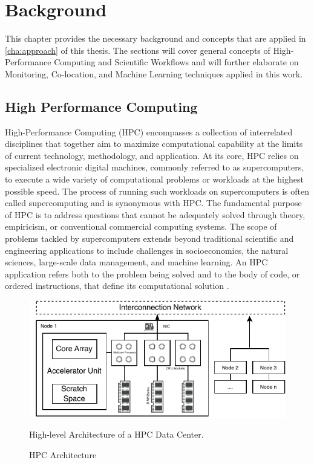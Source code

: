 \section{Background}
\label{cha:background}

This chapter provides the necessary background and concepts that are applied in \ref{cha:approach} of this thesis. The sections will cover general concepts of High-Performance Computing and Scientific Workflows and will further elaborate on Monitoring, Co-location, and Machine Learning techniques applied in this work.

\subsection{High Performance Computing}
\label{sec:background_hpc}
High-Performance Computing (HPC) encompasses a collection of interrelated disciplines that together aim to maximize computational capability at the limits of current technology, methodology, and application. At its core, HPC relies on specialized electronic digital machines, commonly referred to as supercomputers, to execute a wide variety of computational problems or workloads at the highest possible speed. The process of running such workloads on supercomputers is often called supercomputing and is synonymous with HPC. The fundamental purpose of HPC is to address questions that cannot be adequately solved through theory, empiricism, or conventional commercial computing systems. The scope of problems tackled by supercomputers extends beyond traditional scientific and engineering applications to include challenges in socioeconomics, the natural sciences, large-scale data management, and machine learning. An HPC application refers both to the problem being solved and to the body of code, or ordered instructions, that define its computational solution \cite{STERLING201843}.

\begin{figure}[H]
    \centering
    \includegraphics[scale=1.2]{fig/02/02-hpc-nodes.pdf}
    \caption{HPC Architecture}
    \label{fig:02-hpc-nodes}
    \tiny
    High-level Architecture of a HPC Data Center.
\end{figure}

